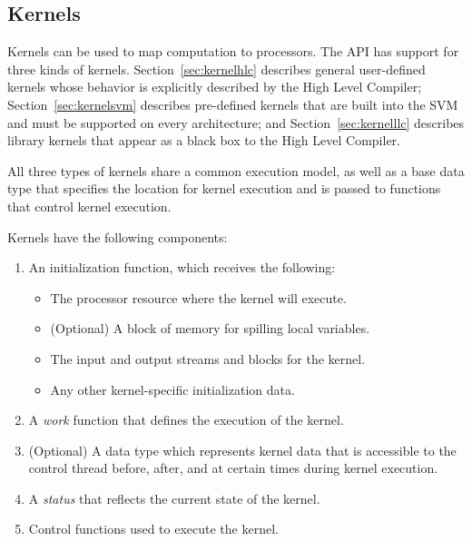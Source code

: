 \callkc
\makeline

\subsection{Kernels}
\label{sec:kernel}

Kernels can be used to map computation to processors.  The API has
support for three kinds of kernels. Section~\ref{sec:kernelhlc}
describes general user-defined kernels whose behavior is explicitly
described by the High Level Compiler; Section~\ref{sec:kernelsvm}
describes pre-defined kernels that are built into the SVM and must be
supported on every architecture; and Section~\ref{sec:kernelllc}
describes library kernels that appear as a black box to the High Level 
Compiler.

All three types of kernels share a common execution model, as well as
a base data type that specifies the location for kernel execution and
is passed to functions that control kernel execution.

Kernels have the following components:

\begin{enumerate}

\item An initialization function, which receives the following: 
\begin{itemize}
\item The processor resource where the kernel will execute. 
\item (Optional) A block of memory for spilling local variables. 
\item The input and output streams and blocks for the kernel. 
\item Any other kernel-specific initialization data. 
\end{itemize}

\item A {\it work} function that defines the execution of the kernel.

\item (Optional) A data type which represents kernel data that is
accessible to the control thread before, after, and at certain times
during kernel execution.

\item A {\it status} that reflects the current state of the kernel.

\item Control functions used to execute the kernel.

\end{enumerate}

